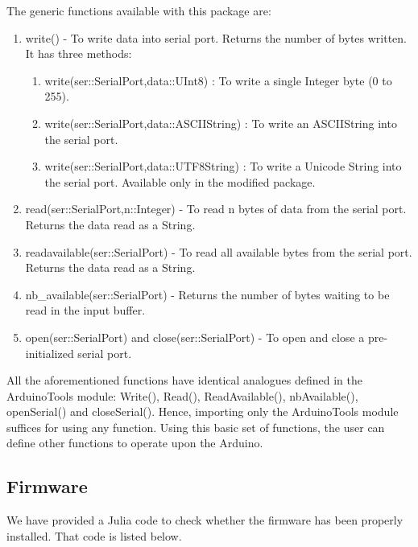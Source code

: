 The generic functions available with this package are:
\begin{enumerate}
      \item write() - To write data into serial port. Returns the number of bytes written.
            It has three methods:
            \begin{enumerate}
                  \item write(ser::SerialPort,data::UInt8) :
                        To write a single Integer byte (0 to 255).
                  \item write(ser::SerialPort,data::ASCIIString) :
                        To write an ASCIIString into the serial port.
                  \item write(ser::SerialPort,data::UTF8String) :
                        To write a Unicode String into the serial port. Available only in the
                        modified package.
            \end{enumerate}
            
      \item read(ser::SerialPort,n::Integer) - To read n bytes of data from the serial
            port. Returns the data read as a String.
            
      \item readavailable(ser::SerialPort) - To read all available bytes from the serial
            port. Returns the data read as a String. 
            
      \item nb\_available(ser::SerialPort) - Returns the number of bytes waiting to be read
            in the input buffer.
            
      \item open(ser::SerialPort) and close(ser::SerialPort) - To open and close a
            pre-initialized serial port.   
            
\end{enumerate}

All the aforementioned functions have identical analogues defined in
the ArduinoTools module:  Write(), Read(), ReadAvailable(),
nbAvailable(), openSerial() and closeSerial(). Hence, importing only
the ArduinoTools module suffices for using any function. Using this
basic set of functions, the user can define other functions to operate
upon the Arduino.


\subsection{Firmware}
\lstset{style=mystyle}
\label{sec:test-firmware-julia}
We have provided a Julia code to check whether the firmware has been
properly installed.  That code is listed below.

